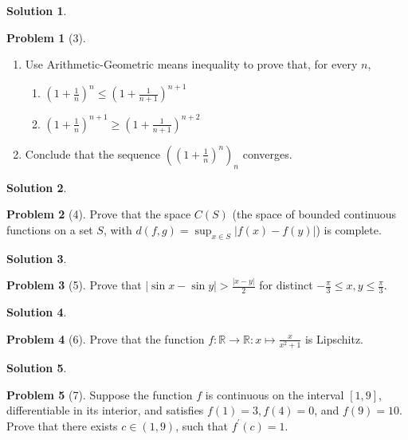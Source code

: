 \documentclass[12pt]{article}
\theoremstyle{definition} %
\newtheorem{solution}{Solution}
\newtheorem{problem}{Problem}
\theoremstyle{plain} %
\begin{document}
\begin{solution}
    
\end{solution}
\begin{problem}[3]
    \begin{enumerate}
       \item Use Arithmetic-Geometric means inequality to prove that, for every $n$, 
       \begin{enumerate}
        \item $\left( 1+\frac{1}{n} \right)^{n}\leq \left( 1+ \frac{1}{n+1} \right)^{n+1}  $ 
        \item $\left( 1+\frac{1}{n} \right)^{n+1}\geq \left( 1+\frac{1}{n+1} \right)^{n+2}  $  
       \end{enumerate}
       \item Conclude that the sequence $\left( \left( 1+\frac{1}{n} \right)^{n}  \right)_n $ converges. 
    \end{enumerate}
\end{problem}
\begin{solution}
    
\end{solution}
\begin{problem}[4]
   Prove that the space $C(S)$ (the space of bounded continuous functions on a set $S$, with $d(f,g)=\sup_{x\in S}\left\vert f(x)-f(y) \right\vert $) is complete.  
\end{problem}
\begin{solution}
    
\end{solution}
\begin{problem}[5]
   Prove that $\left\vert \sin x - \sin y \right\vert > \frac{\left\vert x-y \right\vert}{2} $ for distinct $-\frac{\pi}{3}\leq  x,y \leq \frac{\pi}{3} $.   
\end{problem}
\begin{solution}
    
\end{solution}
\begin{problem}[6]
   Prove that the function $f: \mathbb{{R}}\to \mathbb{{R}}: x\mapsto \frac{x}{x^{2}+1}$ is Lipschitz.
\end{problem}
\begin{solution}
    
\end{solution}
\begin{problem}[7]
   Suppose the function $f$ is continuous on the interval $[1,9]$, differentiable in its interior, and satisfies $f(1)=3, f(4)=0$, and $f(9)=10$. Prove that there exists $c\in (1,9)$, such that $f^\prime (c)=1$.       
\end{problem}
\end{document}
